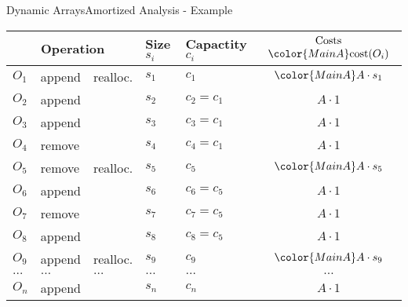 \begin{frame}{Dynamic Arrays}{Amortized Analysis - Example}
  \vspace*{-1.0em}
  \begin{table}[!h]
    \label{tab:amortized_analysis_introduction}%
    \begin{tabular}{|l|l|l|l|l|c|}
      \bottomrule
      \multicolumn{3}{|c|}{Operation} &
      Size {\color{MainA}$s_i$} &
      Capactity {\color{MainA}$c_i$} &
      $\begin{array}{c}
        \text{Costs}\\
        {\color{MainA}\mathrm{cost}(O_i)}
      \end{array}$\\
      \toprule
      $O_1$ & append & {\color{MainA}realloc.} &
      $s_1$ & {\color{MainA}$c_1$} &
      ${\color{MainA}A \cdot s_1}$\\
      $O_2$ & append & {} &
      $s_2$ & $c_2 = c_1$ & $A\cdot 1$\\
      $O_3$ & append & {} &
      $s_3$ & $c_3 = c_1$ & $A\cdot 1$\\
      $O_4$ & remove & {} &
      $s_4$ & $c_4 = c_1$ & $A\cdot 1$\\
      \midrule
      $O_5$ & remove & {\color{MainA}realloc.} &
      $s_5$ & {\color{MainA}$c_5$} &
      ${\color{MainA}A \cdot s_5}$\\
      $O_6$ & append & {} &
      $s_6$ & $c_6 = c_5$ & $A\cdot 1$\\
      $O_7$ & remove & {} &
      $s_7$ & $c_7 = c_5$ & $A\cdot 1$\\
      $O_8$ & append & {} &
      $s_8$ & $c_8 = c_5$ & $A\cdot 1$\\
      \midrule
      $O_9$ & append & {\color{MainA}realloc.} &
      $s_9$ & {\color{MainA}$c_9$} &
      ${\color{MainA}A \cdot s_9}$\\
      $\dots$ & $\dots$ & $\dots$ & $\dots$ & $\dots$ & $\dots$\\
      $O_n$ & append & {} &
      $s_n$ & $c_n$ & $A\cdot 1$\\
      \bottomrule
    \end{tabular}
  \end{table}
\end{frame}


